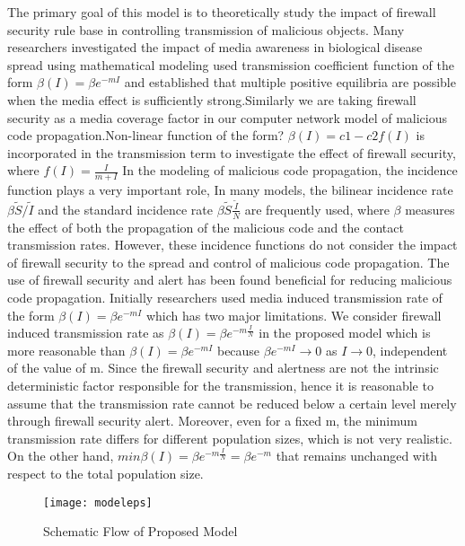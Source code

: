 The primary goal of this model is to theoretically study the impact of firewall security rule base in controlling transmission of malicious objects. Many researchers investigated the impact of media awareness in biological disease spread using mathematical modeling used transmission coefficient function of the form $\beta(I)=\beta e^{-mI}$ and established that multiple positive equilibria are possible when the media effect is sufficiently strong.Similarly we are taking firewall security as a media coverage factor in our computer network model of malicious code propagation.Non-linear function of the form? $\beta(I) = c1 - c2 f (I)$ is incorporated in the transmission term to investigate the effect of firewall security, where $f(I)=\frac{I}{m+I}$ In the modeling of malicious code propagation, the incidence function plays a very important role, In many models, the bilinear incidence rate $\beta \tilde{S}/\tilde{I}$ and the standard incidence rate $\beta\tilde{S}\frac{\tilde{I}}{N}$ are frequently used, where $\beta$ measures the effect of both the propagation of the malicious code and the contact transmission rates. However, these incidence functions do not consider the impact of firewall security to the spread and control of malicious code propagation. The use of firewall security and alert has been found beneficial for reducing malicious code propagation. Initially researchers used media induced transmission rate of the form $\beta(I)=\beta e^{-mI}$ which has two major limitations. We consider firewall induced transmission rate as $\beta(I)=\beta e^{-m\frac{I}{N}}$ in the proposed model which is more reasonable than $\beta(I)=\beta e^{-mI}$ because $\beta e^{-mI}\rightarrow 0$ as $I\rightarrow 0$, independent of the value of m. Since the firewall security and alertness are not the intrinsic deterministic factor responsible for the transmission, hence it is reasonable to assume that the transmission rate cannot be reduced below a certain level merely through firewall security alert. Moreover, even for a fixed m, the minimum transmission rate differs for different population sizes, which is not very realistic. On the other hand, $min {\beta(I)=\beta e^{-m\frac{I}{N}}} =\beta e^{-m}$ that remains unchanged with respect to the total population size.

\newpage
\begin{figure}[h]
 \centering
  \centering
  \texttt{[image: modeleps]}
  \caption{Schematic Flow of Proposed Model}\label{sf1}
 \end{figure}
\newpage
 
